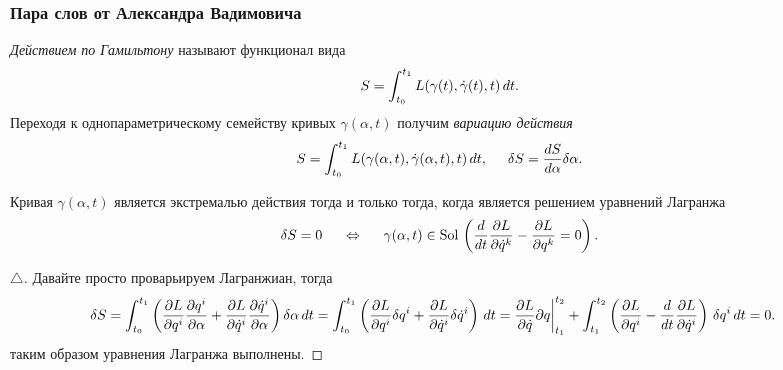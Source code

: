 \subsubsection*{Пара слов от Александра Вадимовича}


\begin{to_def} 
    \textit{Действием по Гамильтону} называют функционал вида
    \begin{equation*}
         S = \int_{t_0}^{t_1} L(\gamma(t), \dot{\gamma}(t), t) \, d t.
    \end{equation*} 
    Переходя к однопараметрическому семейству кривых $\gamma(\alpha, t)$ получим \textit{вариацию действия}
    \begin{equation*}
        S = \int_{t_0}^{t_1} L(\gamma(\alpha, t), \dot{\gamma}(\alpha, t), t) \, d t, 
        \hspace{0.5cm} 
        \delta S = \frac{d S}{d \alpha} \delta \alpha.
    \end{equation*}
\end{to_def}


\begin{to_thr}
    Кривая $\gamma(\alpha, t)$ является экстремалью действия тогда и только тогда, когда является решением уравнений Лагранжа
     \begin{equation*}
         \delta S = 0
         \hspace{0.5cm} \Leftrightarrow \hspace{0.5cm} 
         \gamma(\alpha, t) \in \textnormal{Sol}\,
         \left(
     \frac{d}{dt} \frac{\partial L}{\partial \dot{q}^k} - \frac{\partial L}{\partial q^k} = 0
         \right)
         .
     \end{equation*}
\end{to_thr}


\begin{proof}[$\triangle$]
    Давайте просто проварьируем Лагранжиан, тогда
    \begin{align*}
        \delta S 
        &=
         \int_{t_0}^{t_1} 
        \left(
            \frac{\partial L}{\partial q^i} \frac{\partial q^i}{\partial \alpha} +
            \frac{\partial L}{\partial \dot{q}^i} \frac{\partial \dot{q}^i}{\partial \alpha}  
        \right) \delta \alpha \, d t 
        =
        \int_{t_0}^{t_1} \left(
            \frac{\partial L}{\partial q^i} \delta q^i + \frac{\partial L}{\partial \dot{q}^i} \delta \dot{q}^i
        \right) \, d t
        =
        \frac{\partial L}{\partial \dot{q}} \partial q \bigg|_{t_1}^{t_2}
        + \int_{t_1}^{t_2}
        \left(
            \frac{\partial L}{\partial q^i} - \frac{d }{d t} \frac{\partial L}{\partial \dot{q}^i} 
        \right) \,\delta q^i \, d t
        = 0.
    \end{align*}
    таким образом уравнения Лагранжа выполнены. 
\end{proof}

